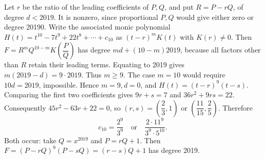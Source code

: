 Let $ r $ be the ratio of the leading coefficients of $ P,Q $, and put $ R=P-rQ $, of degree $ d<2019 $. It is nonzero, since proportional $ P,Q $ would give either zero or degree 20190. Write the associated monic polynomial $ H(t)=t^{10}-7t^9+22t^8+\cdots+c_{10}$ as $(t-r)^mK(t)$ with $ K(r)\ne0 $. Then $ F=R^mQ^{10-m}K(\dfrac{P}{Q})$ has degree $ md+(10-m)2019 $, because all factors other than $ R $ retain their leading terms. Equating to 2019 gives $ m(2019-d)=9\cdot2019 $. Thus $ m\ge9 $. The case $ m=10 $ would require $ 10d=2019 $, impossible. Hence $ m=9,d=0 $, and $ H(t)=(t-r)^9(t-s)$. Comparing the first two coefficients gives $ 9r+s=7 $ and $ 36r^2+9rs=22 $. Consequently $ 45r^2-63r+22=0 $, so $(r,s)=(\dfrac{2}{3},1)$ or $(\dfrac{11}{15},\dfrac{2}{5})$. Therefore
\[\boxed{c_{10}=\dfrac{2^9}{3^9}\quad\text{or}\quad\dfrac{2\cdot11^9}{3^9\cdot5^{10}}}.\]
Both occur: take $ Q=x^{2019}$ and $ P=rQ+1 $. Then $ F=(P-rQ)^9(P-sQ)=(r-s)Q+1 $ has degree 2019.
